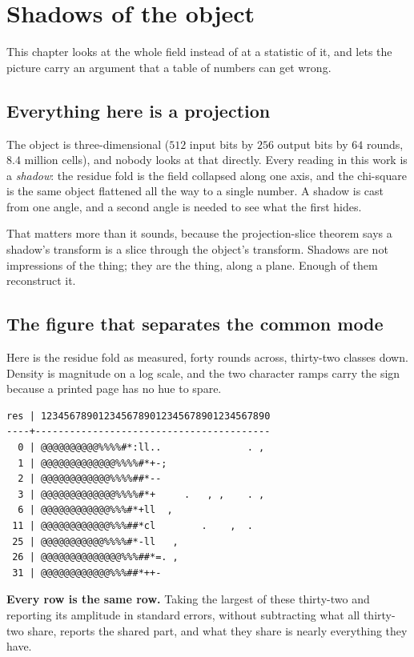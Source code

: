 \chapter{Shadows of the object}

This chapter looks at the whole field instead of at a statistic of it, and lets the picture carry an argument that a table of numbers can get wrong.

\section{Everything here is a projection}

The object is three-dimensional (\(512\) input bits by \(256\) output bits by \(64\) rounds,
\(8.4\) million cells), and nobody looks at that directly. Every reading in this work is a
\emph{shadow}: the residue fold is the field collapsed along one axis, and the chi-square is the
same object flattened all the way to a single number. A shadow is cast from one angle, and a second
angle is needed to see what the first hides.

That matters more than it sounds, because the projection-slice theorem says a shadow's transform is
a slice through the object's transform. Shadows are not impressions of the thing; they are the
thing, along a plane. Enough of them reconstruct it.

\section{The figure that separates the common mode}

Here is the residue fold as measured, forty rounds across, thirty-two classes down. Density is
magnitude on a log scale, and the two character ramps carry the sign because a printed page has no
hue to spare.

\begin{verbatim}
res | 1234567890123456789012345678901234567890
----+-----------------------------------------
  0 | @@@@@@@@@@%%%%#*:ll..               . ,
  1 | @@@@@@@@@@@@@%%%%#*+-;
  2 | @@@@@@@@@@@@%%%%##*--
  3 | @@@@@@@@@@@@@%%%%#*+     .   , ,    . ,
  6 | @@@@@@@@@@@@%%%#*+ll  ,
 11 | @@@@@@@@@@@@%%%##*cl        .    ,  .
 25 | @@@@@@@@@@@%%%%#*-ll   ,
 26 | @@@@@@@@@@@@@@%%%##*=. ,
 31 | @@@@@@@@@@@@%%%##*++-
\end{verbatim}

\textbf{Every row is the same row.} Taking the largest of these thirty-two and reporting its
amplitude in standard errors, without subtracting what all thirty-two share, reports the shared
part, and what they share is nearly everything they have.

